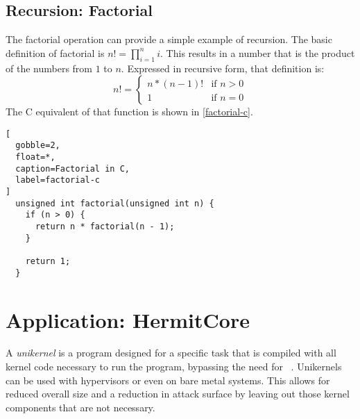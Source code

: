 \subsection{Recursion: Factorial}
The factorial operation can provide a simple example of recursion.
The basic definition of factorial is $n!=\prod_{i=1}^n i$.%
This results in a number that is the product of the numbers from $1$ to $n$.
Expressed in recursive form, that definition is:
\begin{equation}
  n!=\begin{cases}
    n * (n - 1)! & \text{if }n > 0 \\
    1 & \text{if }n = 0
  \end{cases}
\end{equation}
The C equivalent of that function is shown in \cref{factorial-c}.
\begin{lstlisting}[
  gobble=2,
  float=*,
  caption=Factorial in C,
  label=factorial-c
]
  unsigned int factorial(unsigned int n) {
    if (n > 0) {
      return n * factorial(n - 1);
    }
    
    return 1;
  }
\end{lstlisting}


\section{Application: HermitCore}\label{se:cfg_application}
A \emph{unikernel} is a program designed for a specific task
that is compiled with all kernel code necessary to run the program,
bypassing the need for ~\citep{madhavapeddy2014unikernels}.
Unikernels can be used with hypervisors or even on bare metal systems.
This allows for reduced overall size and a reduction in attack surface
by leaving out those kernel components that are not necessary.

